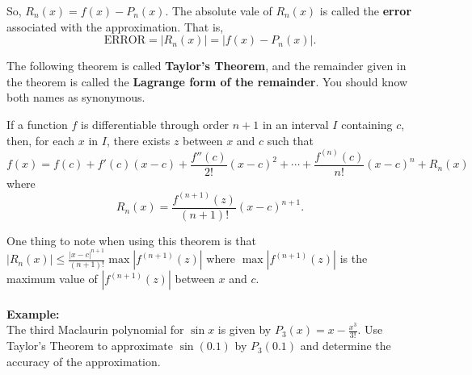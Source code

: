 \documentclass[addpoints, 12pt]{exam}
\begin{document}
\vspace{.2in}

So, $\displaystyle R_n(x)=f(x)-P_n(x)$. The absolute vale of $\displaystyle R_n(x)$ is called the \textbf{error} associated with the approximation. That is,
\[\text{ERROR}=|R_n(x)|=|f(x)-P_n(x)|.\]

The following theorem is called \textbf{Taylor's Theorem}, and the remainder given in the theorem is called the \textbf{Lagrange form of the remainder}. You should know both names as synonymous.

\begin{tcolorbox}[title= TAYLOR'S THEOREM,black,sharp corners,colback=white,colbacktitle=white,coltitle=black]

    If a function $f$ is differentiable through order $n+1$ in an interval $I$ containing $c$, then, for each $x$ in $I$, there exists $z$ between $x$ and $c$ such that
    \[f(x)=f(c)+f'(c)(x-c)+\frac{f''(c)}{2!}(x-c)^2+\cdots+\frac{f^{(n)}(c)}{n!}(x-c)^n+R_n(x)\]
    where
    \[R_n(x)=\frac{f^{(n+1)}(z)}{(n+1)!}(x-c)^{n+1}.\]
    
\end{tcolorbox}
\vspace{.1in}
One thing to note when using this theorem is that $\displaystyle \left|R_n(x)\right|\le\frac{|x-c|^{n+1}}{(n+1)!}\max\left|f^{(n+1)}(z)\right|$ where $\max\left|f^{(n+1)}(z)\right|$ is the maximum value of $\left|f^{(n+1)}(z)\right|$ between $x$ and $c$.\\
\\
\noindent\textbf{Example:}\\
The third Maclaurin polynomial for $\sin x$ is given by $\displaystyle P_3(x)=x-\frac{x^3}{3!}$. Use Taylor's Theorem to approximate $\sin(0.1)$ by $P_3(0.1)$ and determine the accuracy of the approximation.


\newpage
\end{document}
